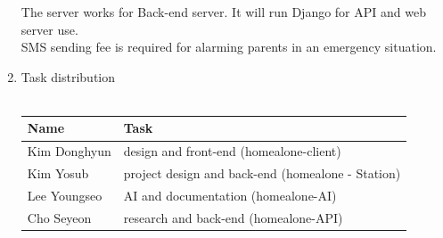 \documentclass[conference]{IEEEtran}
\begin{document}
\begin{enumerate}[label=\arabic*.]
        The server works for Back-end server. It will run Django for API and web server use.\\
        SMS sending fee is required for alarming parents in an emergency situation. \\
    \item {\large{Task distribution}} \\\\
        \begin{tabularx}{0.45\textwidth} { 
        | >{\raggedright\arraybackslash}X 
        | >{\raggedright\arraybackslash}X | }
        \hline
        Name & Task  \\
        \hline
        Kim Donghyun  & design and front-end (homealone-client) \\
        \hline
        Kim Yosub  & project design and back-end (homealone - Station)  \\
        \hline
        Lee Youngseo  & AI and documentation (homealone-AI)  \\
        \hline
        Cho Seyeon  & research and back-end (homealone-API)  \\
        \hline
        \end{tabularx} \\
\end{enumerate}
\end{document}
